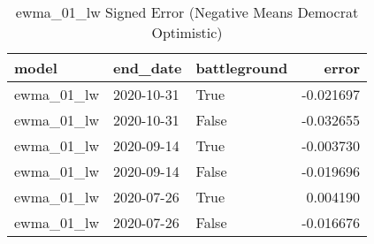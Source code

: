 \begin{table}
\centering
\caption{ewma_01_lw Signed Error
(Negative Means Democrat Optimistic)}
\begin{tabular}{lllr}
\toprule
      model &    end\_date &  battleground &     error \\
\midrule
 ewma\_01\_lw &  2020-10-31 &          True & -0.021697 \\
 ewma\_01\_lw &  2020-10-31 &         False & -0.032655 \\
 ewma\_01\_lw &  2020-09-14 &          True & -0.003730 \\
 ewma\_01\_lw &  2020-09-14 &         False & -0.019696 \\
 ewma\_01\_lw &  2020-07-26 &          True &  0.004190 \\
 ewma\_01\_lw &  2020-07-26 &         False & -0.016676 \\
\bottomrule
\end{tabular}
\end{table}

